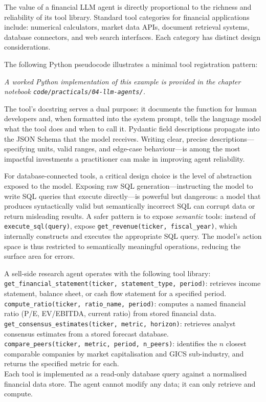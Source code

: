 \begin{deepdive}
The value of a financial LLM agent is directly proportional to the richness and
reliability of its tool library. Standard tool categories for financial applications
include: numerical calculators, market data APIs, document retrieval systems, database
connectors, and web search interfaces. Each category has distinct design considerations.

The following Python pseudocode illustrates a minimal tool registration pattern:

\textit{A worked Python implementation of this example is provided in the chapter notebook \texttt{code/practicals/04-llm-agents/}.}

The tool's docstring serves a dual purpose: it documents the function for human
developers and, when formatted into the system prompt, tells the language model what
the tool does and when to call it. Pydantic field descriptions propagate into the JSON
Schema that the model receives. Writing clear, precise descriptions---specifying units,
valid ranges, and edge-case behaviour---is among the most impactful investments a
practitioner can make in improving agent reliability.

For database-connected tools, a critical design choice is the level of abstraction
exposed to the model. Exposing raw SQL generation---instructing the model to write
SQL queries that execute directly---is powerful but dangerous: a model that produces
syntactically valid but semantically incorrect SQL can corrupt data or return
misleading results. A safer pattern is to expose \emph{semantic} tools: instead of
\texttt{execute\_sql(query)}, expose \texttt{get\_revenue(ticker, fiscal\_year)},
which internally constructs and executes the appropriate SQL query. The model's action
space is thus restricted to semantically meaningful operations, reducing the surface
area for errors.

\begin{example}
\label{ex:db-tools}
A sell-side research agent operates with the following tool library: \\[4pt]
\texttt{get\_financial\_statement(ticker, statement\_type, period)}: retrieves income
statement, balance sheet, or cash flow statement for a specified period. \\[2pt]
\texttt{compute\_ratio(ticker, ratio\_name, period)}: computes a named financial ratio
(P/E, EV/EBITDA, current ratio) from stored financial data. \\[2pt]
\texttt{get\_consensus\_estimates(ticker, metric, horizon)}: retrieves analyst
consensus estimates from a stored forecast database. \\[2pt]
\texttt{compare\_peers(ticker, metric, period, n\_peers)}: identifies the $n$ closest
comparable companies by market capitalisation and GICS sub-industry, and returns the
specified metric for each. \\[4pt]
Each tool is implemented as a read-only database query against a normalised financial
data store. The agent cannot modify any data; it can only retrieve and compute.
\end{example}


\end{deepdive}
